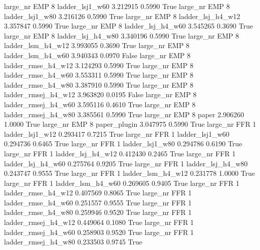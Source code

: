   large_nr      EMP                 8     ladder_lsj1_w60    3.212915      0.5990    True
  large_nr      EMP                 8     ladder_lsj1_w80    3.216126      0.5990    True
  large_nr      EMP                 8   ladder_lsj_h4_w12    3.357847      0.5990    True
  large_nr      EMP                 8   ladder_lsj_h4_w60    3.545265      0.3690    True
  large_nr      EMP                 8   ladder_lsj_h4_w80    3.340196      0.5990    True
  large_nr      EMP                 8   ladder_lsm_h4_w12    3.993055      0.3690    True
  large_nr      EMP                 8   ladder_lsm_h4_w60    3.940343      0.0970   False
  large_nr      EMP                 8  ladder_rmse_h4_w12    3.124293      0.5990    True
  large_nr      EMP                 8  ladder_rmse_h4_w60    3.553311      0.5990    True
  large_nr      EMP                 8  ladder_rmse_h4_w80    3.387910      0.5990    True
  large_nr      EMP                 8 ladder_rmsej_h4_w12    3.963820      0.0195   False
  large_nr      EMP                 8 ladder_rmsej_h4_w60    3.595116      0.4610    True
  large_nr      EMP                 8 ladder_rmsej_h4_w80    3.385561      0.5990    True
  large_nr      EMP                 8               paper    2.906260      1.0000    True
  large_nr      EMP                 8        paper_plugin    3.047975      0.5990    True
  large_nr      FFR                 1     ladder_lsj1_w12    0.293417      0.7215    True
  large_nr      FFR                 1     ladder_lsj1_w60    0.294736      0.6465    True
  large_nr      FFR                 1     ladder_lsj1_w80    0.294786      0.6190    True
  large_nr      FFR                 1   ladder_lsj_h4_w12    0.412430      0.2465    True
  large_nr      FFR                 1   ladder_lsj_h4_w60    0.275764      0.9205    True
  large_nr      FFR                 1   ladder_lsj_h4_w80    0.243747      0.9555    True
  large_nr      FFR                 1   ladder_lsm_h4_w12    0.231778      1.0000    True
  large_nr      FFR                 1   ladder_lsm_h4_w60    0.269605      0.9405    True
  large_nr      FFR                 1  ladder_rmse_h4_w12    0.407569      0.8065    True
  large_nr      FFR                 1  ladder_rmse_h4_w60    0.251557      0.9555    True
  large_nr      FFR                 1  ladder_rmse_h4_w80    0.259946      0.9520    True
  large_nr      FFR                 1 ladder_rmsej_h4_w12    0.449064      0.1080    True
  large_nr      FFR                 1 ladder_rmsej_h4_w60    0.258903      0.9520    True
  large_nr      FFR                 1 ladder_rmsej_h4_w80    0.233503      0.9745    True
